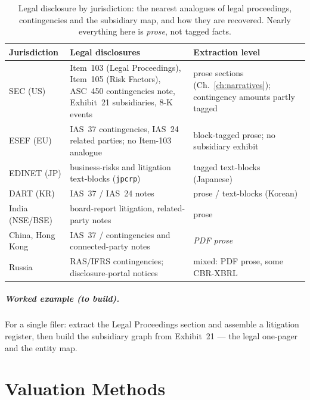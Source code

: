 \documentclass[11pt,a4paper]{report}
\begin{document}
\begin{table}[h]
\centering
\small
\caption{Legal disclosure by jurisdiction: the nearest analogues of legal proceedings, contingencies and the
subsidiary map, and how they are recovered. Nearly everything here is \emph{prose}, not tagged facts.}
\label{tab:legal-jurisdictions}
\begin{tabular}{@{}p{}p{}p{}@{}}
\toprule
\textbf{Jurisdiction} & \textbf{Legal disclosures} & \textbf{Extraction level} \\
\midrule
SEC (US) & Item~103 (Legal Proceedings), Item~105 (Risk Factors), ASC~450 contingencies note, Exhibit~21 subsidiaries, 8-K events & prose sections (Ch.~\ref{ch:narratives}); contingency amounts partly tagged \\
ESEF (EU) & IAS~37 contingencies, IAS~24 related parties; no Item-103 analogue & block-tagged prose; no subsidiary exhibit \\
EDINET (JP) & business-risks and litigation text-blocks (\texttt{jpcrp}) & tagged text-blocks (Japanese) \\
DART (KR) & IAS~37 / IAS~24 notes & prose / text-blocks (Korean) \\
India (NSE/BSE) & board-report litigation, related-party notes & prose \\
China, Hong Kong & IAS~37 / contingencies and connected-party notes & \emph{PDF prose} \\
Russia & RAS/IFRS contingencies; disclosure-portal notices & mixed: PDF prose, some CBR-XBRL \\
\bottomrule
\end{tabular}
\end{table}

\paragraph{Worked example (to build).} For a single filer: extract the Legal Proceedings section and assemble a
litigation register, then build the subsidiary graph from Exhibit~21 --- the legal one-pager and the entity map.

\chapter{Valuation Methods}
\label{ch:valuation}
\end{document}
